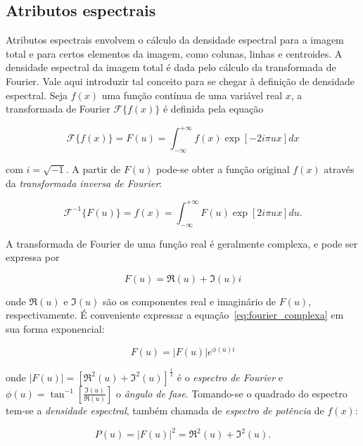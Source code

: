 \subsection{Atributos espectrais}

Atributos espectrais envolvem o cálculo da densidade espectral para a
imagem total e para certos elementos da imagem, como colunas, linhas e
centroides. A densidade espectral da imagem total é dada pelo cálculo
da transformada de Fourier. Vale aqui introduzir tal conceito para se
chegar à definição de densidade espectral. Seja $f(x)$ uma função
contínua de uma variável real $x$, a transformada de Fourier
$\mathcal{F}\{f(x)\}$ é definida pela equação

\begin{equation}
  \mathcal{F}\{f(x)\} = F(u) = \int_{-\infty}^{+\infty} f(x) \exp[-2i\pi u x] dx
\end{equation}

\noindent com $i = \sqrt{-1}$. A partir de $F(u)$ pode-se obter a função
original $f(x)$ através da \emph{transformada inversa de Fourier}:

\begin{equation}
  \mathcal{F}^{-1}\{F(u)\} = f(x) = \int_{-\infty}^{+\infty} F(u) \exp[2i\pi u x] du.
\end{equation}

A transformada de Fourier de uma função real é geralmente complexa, e pode ser
expressa por

\begin{equation}
  F(u) = \Re(u) + \Im(u)i
  \label{eq:fourier_complexa}
\end{equation}

\noindent onde $\Re(u)$ e $\Im(u)$ são os componentes real e imaginário de
$F(u)$, respectivamente. É conveniente expressar a
equação~\ref{eq:fourier_complexa} em sua forma exponencial:

\begin{equation}
  F(u) = |F(u)|e^{\phi(u)i}
\end{equation}

\noindent onde $|F(u)| = \left[\Re^2(u) + \Im^2(u)\right]^{\frac{1}{2}}$ é o
\emph{espectro de Fourier} e
$\phi(u) = \tan^{-1}\left[\frac{\Im(u)}{\Re(u)}\right]$ o \emph{ângulo de
  fase}. Tomando-se o quadrado do espectro tem-se a \emph{densidade espectral},
também chamada de \emph{espectro de potência} de $f(x)$:

\begin{equation}
  P(u) = |F(u)|^2 = \Re^2(u) + \Im^2(u).
  \label{eq:densidade}
\end{equation}

